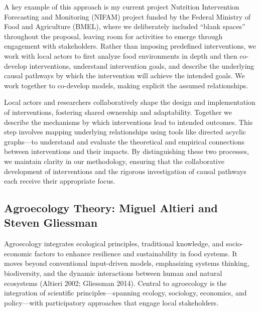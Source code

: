 \documentclass[
]{article}
\begin{document}
A key example of this approach is my current project Nutrition
Intervention Forecasting and Monitoring (NIFAM) project funded by the
Federal Ministry of Food and Agriculture (BMEL), where we deliberately
included ``blank spaces'' throughout the proposal, leaving room for
activities to emerge through engagement with stakeholders. Rather than
imposing predefined interventions, we work with local actors to first
analyze food environments in depth and then co-develop interventions,
understand intervention goals, and describe the underlying causal
pathways by which the intervention will achieve the intended goals. We
work together to co-develop models, making explicit the assumed
relationships.

Local actors and researchers collaboratively shape the design and
implementation of interventions, fostering shared ownership and
adaptability. Together we describe the mechanisms by which interventions
lead to intended outcomes. This step involves mapping underlying
relationships using tools like directed acyclic graphs---to understand
and evaluate the theoretical and empirical connections between
interventions and their impacts. By distinguishing these two processes,
we maintain clarity in our methodology, ensuring that the collaborative
development of interventions and the rigorous investigation of causal
pathways each receive their appropriate focus.

\hypertarget{agroecology-theory-miguel-altieri-and-steven-gliessman}{%
\subsection*{Agroecology Theory: Miguel Altieri and Steven
Gliessman}\label{agroecology-theory-miguel-altieri-and-steven-gliessman}}

Agroecology integrates ecological principles, traditional knowledge, and
socio-economic factors to enhance resilience and sustainability in food
systems. It moves beyond conventional input-driven models, emphasizing
systems thinking, biodiversity, and the dynamic interactions between
human and natural ecosystems (Altieri 2002; Gliessman 2014). Central to
agroecology is the integration of scientific principles---spanning
ecology, sociology, economics, and policy---with participatory
approaches that engage local stakeholders.
\end{document}
